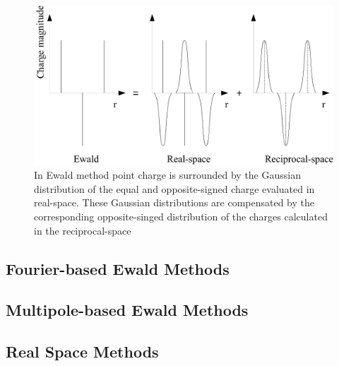 \begin{figure}[tpb]
  \begin{center}
    \centerline{\includegraphics[scale=0.8]{Ewaldsum.pdf}}
    \caption{In Ewald method point charge is surrounded by the Gaussian distribution of the equal and opposite-signed charge evaluated in real-space. These Gaussian distributions are compensated by the corresponding opposite-singed distribution of the charges calculated in the reciprocal-space }
    \label{fig:Ewaldsum}
  \end{center}
\end{figure}

\subsection{Fourier-based Ewald Methods}

\subsection{Multipole-based Ewald Methods}

\subsection{Real Space Methods}


